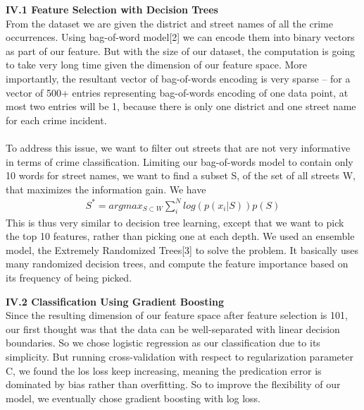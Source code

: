 \documentclass[12pt]{article}
\newenvironment{p3}[2][Part IV Methods]{\begin{trivlist}
\item[\hskip \labelsep {\bfseries #1}\hskip \labelsep {\bfseries #2}]}{\end{trivlist}}
\begin{document}
\begin{p3}{}
\item{\textbf{IV.1 Feature Selection with Decision Trees\\}}
From the dataset we are given the district and street names of all the crime occurrences. Using bag-of-word model[2] we can encode them into binary vectors as part of our feature. But with the size of our dataset, the computation is going to take very long time given the dimension of our feature space. More importantly, the resultant vector of bag-of-words encoding is very sparse -- for a vector of 500+ entries representing bag-of-words encoding of one data point, at most two entries will be 1, because there is only one district and one street name for each crime incident.\\\\
To address this issue, we want to filter out streets that are not very informative in terms of crime classification. Limiting our bag-of-words model to contain only 10 words for street names, we want to find a subset S, of the set of all streets W, that maximizes the information gain. We have
\begin{align*}
	S^* = argmax_{S \subset W} \sum_i^N log(p(x_i|S)) p(S)
\end{align*}
This is thus very similar to decision tree learning, except that we want to pick the top 10 features, rather than picking one at each depth. We used an ensemble model, the Extremely Randomized Trees[3] to solve the problem. It basically uses many randomized decision trees, and compute the feature importance based on its frequency of being picked.\\

\item{\textbf{IV.2 Classification Using Gradient Boosting\\}}
Since the resulting dimension of our feature space after feature selection is 101, our first thought was that the data can be well-separated with linear decision boundaries. So we chose logistic regression as our classification due to its simplicity. But running cross-validation with respect to regularization parameter C, we found the los loss keep increasing, meaning the predication error is dominated by bias rather than overfitting. So to improve the flexibility of our model, we eventually chose gradient boosting with log loss.
\end{p3}
\end{document}
